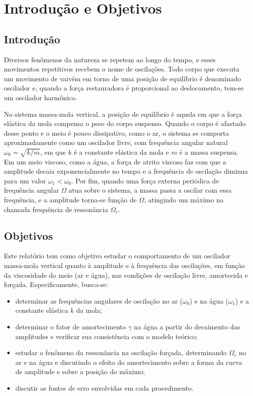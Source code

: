 \section{Introdução e Objetivos}

\subsection{Introdução}

Diversos fenômenos da natureza se repetem ao longo do tempo, e esses movimentos repetitivos recebem o nome de oscilações. Todo corpo que executa um movimento de vaivém em torno de uma posição de equilíbrio é denominado oscilador e, quando a força restauradora é proporcional ao deslocamento, tem-se um oscilador harmônico.

No sistema massa-mola vertical, a posição de equilíbrio é aquela em que a força elástica da mola compensa o peso do corpo suspenso. Quando o corpo é afastado desse ponto e o meio é pouco dissipativo, como o ar, o sistema se comporta aproximadamente como um oscilador livre, com frequência angular natural $\omega_0=\sqrt{k/m}$, em que $k$ é a constante elástica da mola e $m$ é a massa suspensa. Em um meio viscoso, como a água, a força de atrito viscoso faz com que a amplitude decaia exponencialmente no tempo e a frequência de oscilação diminua para um valor $\omega_1<\omega_0$. Por fim, quando uma força externa periódica de frequência angular $\Omega$ atua sobre o sistema, a massa passa a oscilar com essa frequência, e a amplitude torna-se função de $\Omega$, atingindo um máximo na chamada frequência de ressonância $\Omega_r$.

\subsection{Objetivos}

Este relatório tem como objetivo estudar o comportamento de um oscilador massa-mola vertical quanto à amplitude e à frequência das oscilações, em função da viscosidade do meio (ar e água), nas condições de oscilação livre, amortecida e forçada. Especificamente, busca-se:
\begin{itemize}
    \item determinar as frequências angulares de oscilação no ar ($\omega_0$) e na água ($\omega_1$) e a constante elástica $k$ da mola;
    \item determinar o fator de amortecimento $\gamma$ na água a partir do decaimento das amplitudes e verificar sua consistência com o modelo teórico;
    \item estudar o fenômeno da ressonância na oscilação forçada, determinando $\Omega_r$ no ar e na água e discutindo o efeito do amortecimento sobre a forma da curva de amplitude e sobre a posição do máximo;
    \item discutir as fontes de erro envolvidas em cada procedimento.
\end{itemize}
